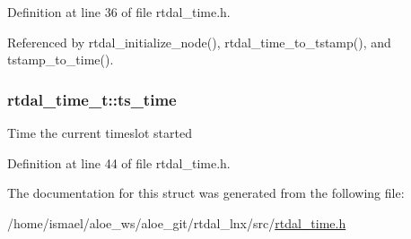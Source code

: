 Definition at line 36 of file rtdal\-\_\-time.\-h.



Referenced by rtdal\-\_\-initialize\-\_\-node(), rtdal\-\_\-time\-\_\-to\-\_\-tstamp(), and tstamp\-\_\-to\-\_\-time().

\hypertarget{structrtdal__time__t_aa824a8a4634d0a302803df0694429cb0}{
\subsubsection[{ts\-\_\-time}]{ rtdal\-\_\-time\-\_\-t\-::ts\-\_\-time}}\label{structrtdal__time__t_aa824a8a4634d0a302803df0694429cb0}
Time the current timeslot started 

Definition at line 44 of file rtdal\-\_\-time.\-h.



The documentation for this struct was generated from the following file\-:\begin{DoxyCompactItemize}
\item 
/home/ismael/aloe\-\_\-ws/aloe\-\_\-git/rtdal\-\_\-lnx/src/\hyperlink{rtdal__time_8h}{rtdal\-\_\-time.\-h}\end{DoxyCompactItemize}
